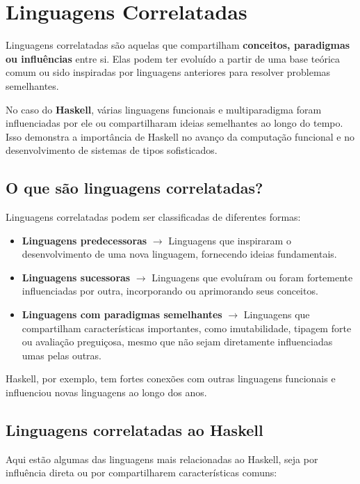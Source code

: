 \section{Linguagens Correlatadas}

Linguagens correlatadas são aquelas que compartilham \textbf{conceitos, paradigmas ou influências} entre si. Elas podem ter evoluído a partir de uma base teórica comum ou sido inspiradas por linguagens anteriores para resolver problemas semelhantes.

No caso do \textbf{Haskell}, várias linguagens funcionais e multiparadigma foram influenciadas por ele ou compartilharam ideias semelhantes ao longo do tempo. Isso demonstra a importância de Haskell no avanço da computação funcional e no desenvolvimento de sistemas de tipos sofisticados.

\subsection{O que são linguagens correlatadas?}

Linguagens correlatadas podem ser classificadas de diferentes formas:

\begin{itemize}
    \item \textbf{Linguagens predecessoras} $\rightarrow$ Linguagens que inspiraram o desenvolvimento de uma nova linguagem, fornecendo ideias fundamentais.
    \item \textbf{Linguagens sucessoras} $\rightarrow$ Linguagens que evoluíram ou foram fortemente influenciadas por outra, incorporando ou aprimorando seus conceitos.
    \item \textbf{Linguagens com paradigmas semelhantes} $\rightarrow$ Linguagens que compartilham características importantes, como imutabilidade, tipagem forte ou avaliação preguiçosa, mesmo que não sejam diretamente influenciadas umas pelas outras.
\end{itemize}

Haskell, por exemplo, tem fortes conexões com outras linguagens funcionais e influenciou novas linguagens ao longo dos anos.

\subsection{Linguagens correlatadas ao Haskell}

Aqui estão algumas das linguagens mais relacionadas ao Haskell, seja por influência direta ou por compartilharem características comuns:

